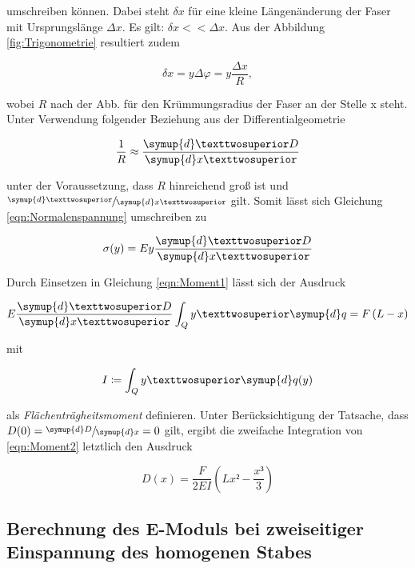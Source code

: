 \noindent umschreiben können. Dabei steht $\delta x$ für eine kleine Längenänderung der Faser mit Ursprungslänge $\Delta x$. Es gilt:
$\delta x << \Delta x$. Aus der Abbildung \ref{fig:Trigonometrie} resultiert zudem 

\begin{equation*}
    \delta x = y\Delta\varphi = y\frac{\Delta x}{R},
\end{equation*}

\noindent wobei $R$ nach der Abb. für den Krümmungsradius der Faser an der Stelle x steht. Unter Verwendung folgender Beziehung aus der 
Differentialgeometrie

\begin{equation*}
    \frac{1}{R} \approx \frac{\symup{d}²D}{\symup{d}x²}
\end{equation*}

\noindent unter der Voraussetzung, dass $R$ hinreichend groß ist und $\sfrac{\symup{d}²}{\symup{d}x²}$ gilt. Somit lässt sich
Gleichung \eqref{eqn:Normalenspannung} umschreiben zu

\begin{equation*}
    \sigma(y) = Ey\frac{\symup{d}²D}{\symup{d}x²}
\end{equation*}

\noindent Durch Einsetzen in Gleichung \eqref{eqn:Moment1} lässt sich der Ausdruck

\begin{equation}
\label{eqn:Moment2}
    E\frac{\symup{d}²D}{\symup{d}x²}\int_Q y²\symup{d}q = F\left(L-x\right)
\end{equation}

\noindent mit

\begin{equation*}
    I \coloneqq \int_Q y²\symup{d}q(y)
\end{equation*}

\noindent als \emph{Flächenträgheitsmoment} definieren. Unter Berücksichtigung der Tatsache, dass $D(0) = \sfrac{\symup{d}D}{\symup{d}x} = 0$ gilt, ergibt die zweifache Integration
von \eqref{eqn:Moment2} letztlich den Ausdruck

\begin{equation}
    D(x) = \frac{F}{2EI}\left(Lx²-\frac{x³}{3}\right)
    \label{eqn:Biegung_einseitig}
\end{equation}

\subsection{Berechnung des E-Moduls bei zweiseitiger Einspannung des homogenen Stabes}

